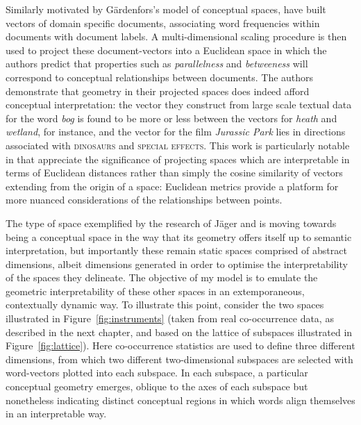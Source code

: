 Similarly motivated by G\"{a}rdenfors's model of conceptual spaces, \cite{DerracEA2015} have built vectors of domain specific documents, associating word frequencies within documents with document labels.  A multi-dimensional scaling procedure is then used to project these document-vectors into a Euclidean space in which the authors predict that properties such as \emph{parallelness} and \emph{betweeness} will correspond to conceptual relationships between documents.  The authors demonstrate that geometry in their projected spaces does indeed afford conceptual interpretation: the vector they construct from large scale textual data for the word \emph{bog} is found to be more or less between the vectors for \emph{heath} and \emph{wetland}, for instance, and the vector for the film \emph{Jurassic Park} lies in directions associated with \textsc{dinosaurs} and \textsc{special effects}.  This work is particularly notable in that \citeauthor{DerracEA2015} appreciate the significance of projecting spaces which are interpretable in terms of Euclidean distances rather than simply the cosine similarity of vectors extending from the origin of a space: Euclidean metrics provide a platform for more nuanced considerations of the relationships between points.

The type of space exemplified by the research of J\"{a}ger and \citeauthor{DerracEA2015} is moving towards being a conceptual space in the way that its geometry offers itself up to semantic interpretation, but importantly these remain static spaces comprised of abstract dimensions, albeit dimensions generated in order to optimise the interpretability of the spaces they delineate.  The objective of my model is to emulate the geometric interpretability of these other spaces in an extemporaneous, contextually dynamic way.  To illustrate this point, consider the two spaces illustrated in Figure~\ref{fig:instruments} (taken from real co-occurrence data, as described in the next chapter, and based on the lattice of subspaces illustrated in Figure~\ref{fig:lattice}).  Here co-occurrence statistics are used to define three different dimensions, from which two different two-dimensional subspaces are selected with word-vectors plotted into each subspace.  In each subspace, a particular conceptual geometry emerges, oblique to the axes of each subspace but nonetheless indicating distinct conceptual regions in which words align themselves in an interpretable way.

